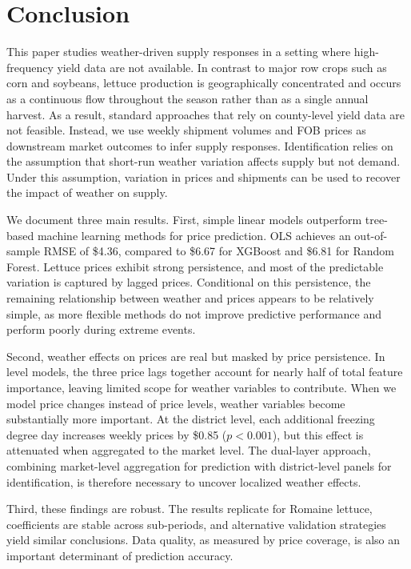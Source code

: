 \documentclass[12pt]{article}
\begin{document}
\section{Conclusion}
\label{sec:conclusion}

This paper studies weather-driven supply responses in a setting where high-frequency yield data are not available. In contrast to major row crops such as corn and soybeans, lettuce production is geographically concentrated and occurs as a continuous flow throughout the season rather than as a single annual harvest. As a result, standard approaches that rely on county-level yield data are not feasible. Instead, we use weekly shipment volumes and FOB prices as downstream market outcomes to infer supply responses. Identification relies on the assumption that short-run weather variation affects supply but not demand. Under this assumption, variation in prices and shipments can be used to recover the impact of weather on supply.

We document three main results. First, simple linear models outperform tree-based machine learning methods for price prediction. OLS achieves an out-of-sample RMSE of \$4.36, compared to \$6.67 for XGBoost and \$6.81 for Random Forest. Lettuce prices exhibit strong persistence, and most of the predictable variation is captured by lagged prices. Conditional on this persistence, the remaining relationship between weather and prices appears to be relatively simple, as more flexible methods do not improve predictive performance and perform poorly during extreme events.

Second, weather effects on prices are real but masked by price persistence. In level models, the three price lags together account for nearly half of total feature importance, leaving limited scope for weather variables to contribute. When we model price changes instead of price levels, weather variables become substantially more important. At the district level, each additional freezing degree day increases weekly prices by \$0.85 ($p < 0.001$), but this effect is attenuated when aggregated to the market level. The dual-layer approach, combining market-level aggregation for prediction with district-level panels for identification, is therefore necessary to uncover localized weather effects.

Third, these findings are robust. The results replicate for Romaine lettuce, coefficients are stable across sub-periods, and alternative validation strategies yield similar conclusions. Data quality, as measured by price coverage, is also an important determinant of prediction accuracy.
\end{document}
